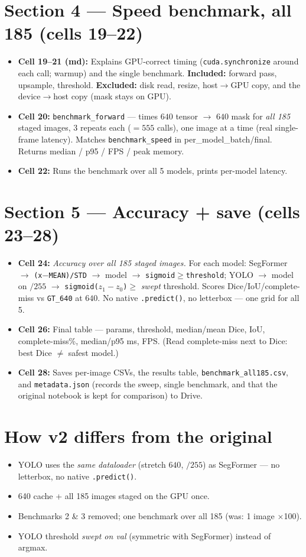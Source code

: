 \documentclass[11pt]{article}
\newcommand{\code}[1]{\texttt{\small #1}}
\begin{document}
\section*{Section 4 --- Speed benchmark, all 185 (cells 19--22)}
\begin{itemize}
\item \textbf{Cell 19--21 (md):} Explains GPU-correct timing (\code{cuda.synchronize} around each call; warmup) and the single benchmark. \textbf{Included:} forward pass, upsample, threshold. \textbf{Excluded:} disk read, resize, host$\to$GPU copy, and the device$\to$host copy (mask stays on GPU).
\item \textbf{Cell 20:} \code{benchmark\_forward} --- times $640$ tensor $\to$ $640$ mask for \emph{all 185} staged images, 3 repeats each ($=555$ calls), one image at a time (real single-frame latency). Matches \code{benchmark\_speed} in per\_model\_batch/final. Returns median / p95 / FPS / peak memory.
\item \textbf{Cell 22:} Runs the benchmark over all 5 models, prints per-model latency.
\end{itemize}

\section*{Section 5 --- Accuracy + save (cells 23--28)}
\begin{itemize}
\item \textbf{Cell 24:} \emph{Accuracy over all 185 staged images.} For each model: SegFormer $\to$ \code{(x$-$MEAN)/STD} $\to$ model $\to$ \code{sigmoid$\geq$threshold}; YOLO $\to$ model on $/255$ $\to$ \code{sigmoid($z_1-z_0$)$\geq$} \emph{swept} threshold. Scores Dice/IoU/complete-miss vs \code{GT\_640} at $640$. No native \code{.predict()}, no letterbox --- one grid for all 5.
\item \textbf{Cell 26:} Final table --- params, threshold, median/mean Dice, IoU, complete-miss\%, median/p95 ms, FPS. (Read complete-miss next to Dice: best Dice $\neq$ safest model.)
\item \textbf{Cell 28:} Saves per-image CSVs, the results table, \code{benchmark\_all185.csv}, and \code{metadata.json} (records the sweep, single benchmark, and that the original notebook is kept for comparison) to Drive.
\end{itemize}

\section*{How v2 differs from the original}
\begin{itemize}
\item YOLO uses the \emph{same dataloader} (stretch $640$, $/255$) as SegFormer --- no letterbox, no native \code{.predict()}.
\item 640 cache + all 185 images staged on the GPU once.
\item Benchmarks 2 \& 3 removed; one benchmark over all 185 (was: 1 image $\times$100).
\item YOLO threshold \emph{swept on val} (symmetric with SegFormer) instead of argmax.
\end{itemize}
\end{document}
